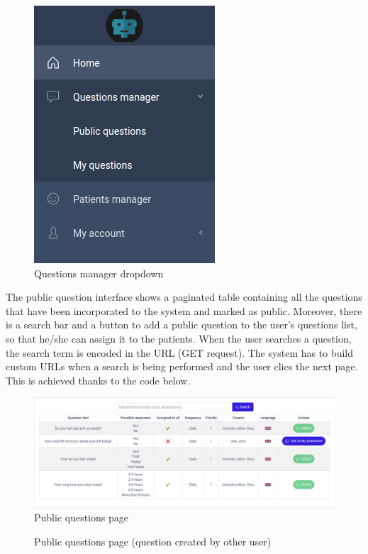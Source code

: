 \documentclass[12pt,english]{article}
\begin{document}
\begin{figure}[H]
    \centering
    \includegraphics[width=0.3  \textwidth]{questions_dropdown.png}
    \caption{Questions manager dropdown}
\end{figure}

The public question interface shows a paginated table containing all the questions that have been incorporated to the system and marked as public. Moreover, there is a search bar and a button to add a public question to the user's questions list, so that he/she can assign it to the patients. When the user searches a question, the search term is encoded in the URL (GET request). The system has to build custom URLs when a search is being performed and the user clics the next page. This is achieved thanks to the code below.

\begin{figure}[H]
    \centering
    \includegraphics[width=\textwidth]{public_questions.png}
    \caption{Public questions page}
\end{figure}

\begin{figure}[H]
    \caption{Public questions page (question created by other user)}
\end{figure}
\end{document}
